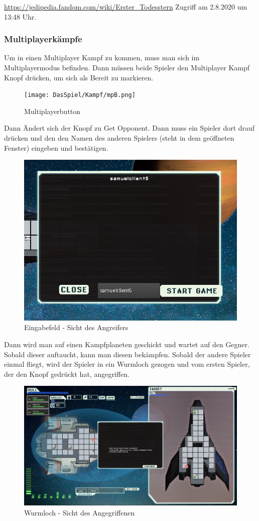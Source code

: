 \documentclass[fontsize=12pt,paper=a4,twoside]{scrartcl}
\begin{document}
\url{https://jedipedia.fandom.com/wiki/Erster_Todesstern} Zugriff am 2.8.2020 um 13:48 Uhr.

\subsubsection{Multiplayerkämpfe}

Um in einen Multiplayer Kampf zu kommen, muss man sich im Multiplayermodus befinden. Dann müssen beide Spieler den Multiplayer Kampf Knopf drücken, um sich als Bereit zu markieren. 

\begin{figure}[H]
\centering
\texttt{[image: DasSpiel/Kampf/mpB.png]}
\caption{Multiplayerbutton}
\end{figure}

 Dann Ändert sich der Knopf zu Get Opponent. Dann muss ein Spieler dort drauf drücken und den den Namen des anderen Spielers (steht in dem geöffneten Fenster) eingeben und bestätigen.

\begin{figure}[H]
\centering
\includegraphics[width=0.8\linewidth]{DasSpiel/Kampf/join.png}
\caption{Eingabefeld - Sicht des Angreifers}
\end{figure}
 
 Dann wird man auf einen Kampfplaneten geschickt und wartet auf den Gegner. Sobald dieser auftaucht, kann man diesen bekämpfen. Sobald der andere Spieler einmal fliegt, wird der Spieler in ein Wurmloch gezogen und vom ersten Spieler, der den Knopf gedrückt hat, angegriffen. 

\begin{figure}[H]
\centering
\includegraphics[width=0.8\linewidth]{DasSpiel/Kampf/wurmloch.png}
\caption{Wurmloch - Sicht des Angegriffenen}
\end{figure}
\end{document}
